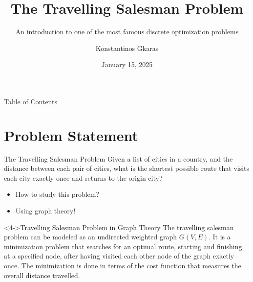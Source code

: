 \documentclass[aspectratio=169,xcolor=dvipsnames, t]{beamer}
\title{The Travelling Salesman Problem} %
\subtitle{An introduction to one of the most famous discrete optimization problems}
\author{Konstantinos Gkaras}
\institute[University of Groningen, Faculty Science and Engineering]{Faculty Science and Engineering
\newline
University of Groningen
}
\date{January 15, 2025} %
\begin{document}
\maketitlepage

\begin{frame}[t]{Table of Contents}
	\vspace{-5mm}
    \tableofcontents
\end{frame}


\section{Problem Statement}
\begin{frame}[noframenumbering]{The Travelling Salesman Problem} 
	\vspace{-5mm}
	Given a list of cities in a country, and the distance between each pair of cities, what is the shortest possible route that visits each city exactly once and returns to the origin city?
	\vspace{1mm}
	\begin{itemize}
		\item<2-> How to study this problem?
		\item<3-> Using graph theory!
	\end{itemize}
	\begin{block}<4->{Travelling Salesman Problem in Graph Theory}
		The travelling salesman problem can be modeled as an undirected weighted graph \( G(V, E) \). It is a minimization problem that searches for an optimal route, starting and finishing at a specified node, after having visited each other node of the graph exactly once. The minimization is done in terms of the cost function that measures the overall distance travelled.
	\end{block}
\end{frame}

\end{document}
